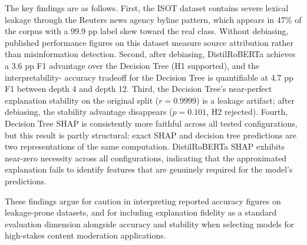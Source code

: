 \documentclass[journal,10pt,twocolumn]{IEEEtran}
\begin{document}
The key findings are as follows.  First, the ISOT dataset contains
severe lexical leakage through the Reuters news agency byline pattern,
which appears in 47\% of the corpus with a 99.9 pp label skew toward
the real class.  Without debiasing, published performance figures on
this dataset measure source attribution rather than misinformation
detection.  Second, after debiasing, DistilRoBERTa achieves a 3.6 pp F1
advantage over the Decision Tree (H1 supported), and the interpretability-
accuracy tradeoff for the Decision Tree is quantifiable at 4.7 pp F1
between depth 4 and depth 12.  Third, the Decision Tree's near-perfect
explanation stability on the original split ($r = 0.9999$) is a
leakage artifact; after debiasing, the stability advantage disappears
($p = 0.101$, H2 rejected).  Fourth, Decision Tree SHAP is consistently
more faithful across all tested configurations, but this result is partly
structural: exact SHAP and decision tree predictions are two
representations of the same computation.  DistilRoBERTa SHAP exhibits
near-zero necessity across all configurations, indicating that the
approximated explanation fails to identify features that are genuinely
required for the model's predictions.

These findings argue for caution in interpreting reported accuracy figures
on leakage-prone datasets, and for including explanation fidelity as a
standard evaluation dimension alongside accuracy and stability when
selecting models for high-stakes content moderation applications.
\end{document}
